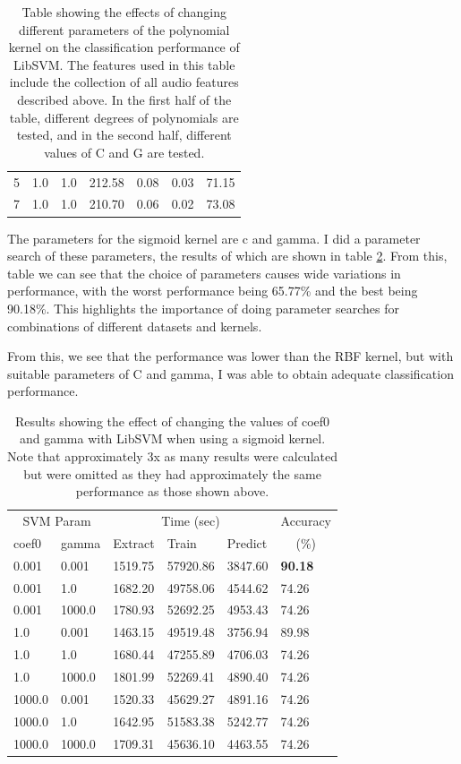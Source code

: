 \documentclass[12pt,oneside]{book}
\begin{document}
\begin{table}
\begin{tabular}{|l|l|l|l|l|l|l|}
\hline
5  & 1.0    & 1.0     &  212.58  &  0.08  &  0.03  &  71.15  \\
7  & 1.0    & 1.0     &  210.70  &  0.06  &  0.02  &  73.08  \\
\hline
\end{tabular}
\caption{Table showing the effects of changing
  different parameters of the polynomial kernel on the classification
  performance of LibSVM.  The features used in this table include the
  collection of all audio features described above.  In the first half
  of the table, different degrees of polynomials are tested, and in
  the second half, different values of C and G are tested.}
\label{table:obv-libsvm-poly}
\end{table}

The parameters for the sigmoid kernel are c and gamma.  I did a
parameter search of these parameters, the results of which are shown
in table \ref{table:obv-libsvm-sigmoid}.  From this, table we can see
that the choice of parameters causes wide variations in performance,
with the worst performance being 65.77\% and the best being 90.18\%.
This highlights the importance of doing parameter searches for
combinations of different datasets and kernels.

From this, we see that the performance was lower than the RBF kernel,
but with suitable parameters of C and gamma, I was able to obtain
adequate classification performance.


\begin{table}
\begin{tabular}{|l|l|l|l|l|l|}
\hline
\multicolumn{2}{|c|}{SVM Param} & \multicolumn{3}{c|}{Time (sec)} & Accuracy \\
\hhline{|-|-|-|-|-|~|}
coef0 & gamma & Extract & Train & Predict & \multicolumn{1}{c|}{(\%)} \\
\hhline{|=|=|=|=|=|=|}
0.001  & 0.001   &  1519.75  &   57920.86  &  3847.60  &  \textbf{90.18}  \\
0.001  & 1.0     &  1682.20  &   49758.06  &  4544.62  &  74.26  \\
0.001  & 1000.0  &  1780.93  &   52692.25  &  4953.43  &  74.26  \\
1.0    & 0.001   &  1463.15  &   49519.48  &  3756.94  &  89.98  \\
1.0    & 1.0     &  1680.44  &   47255.89  &  4706.03  &  74.26  \\
1.0    & 1000.0  &  1801.99  &   52269.41  &  4890.40  &  74.26  \\
1000.0 & 0.001   &  1520.33  &   45629.27  &  4891.16  &  74.26  \\
1000.0 & 1.0     &  1642.95  &   51583.38  &  5242.77  &  74.26  \\
1000.0 & 1000.0  &  1709.31  &   45636.10  &  4463.55  &  74.26  \\
\hline
\end{tabular}
\caption{Results showing the effect of changing the values of coef0
  and gamma with LibSVM when using a sigmoid kernel. Note that
  approximately 3x as many results were calculated but were omitted as
  they had approximately the same performance as those shown above.}
\label{table:obv-libsvm-sigmoid}
\end{table}
\end{document}
